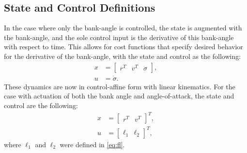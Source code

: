 \subsection{State and Control Definitions}
In the case where only the bank-angle is controlled, the state is augmented with the bank-angle, and the sole control input is the derivative of this bank-angle with respect to time. This allows for cost functions that specify desired behavior for the derivative of the bank-angle, with the state and control as the following:
\begin{align}
x &= \begin{bmatrix} r^T & v^T & \sigma \end{bmatrix} ,\\ 
u &= \dot{\sigma}.
\end{align}
These dynamics are now in control-affine form with linear kinematics.  For the case with actuation of both the bank angle and angle-of-attack, the state and control are the following:
\begin{align}
x &= \begin{bmatrix} r^T & v^T \end{bmatrix}^T ,\\ 
u &= \begin{bmatrix} \ell_1 & \ell_2 \end{bmatrix}^T,
\end{align}
where $\ell_1$ and $\ell_2$ were defined in \eqref{eq:fl}. 
